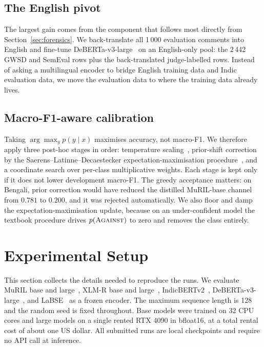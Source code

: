 \documentclass{ceurart}
\begin{document}
\subsection{The English pivot}
\label{sec:pivot}

The largest gain comes from the component that follows most directly from
Section~\ref{sec:forensics}. We back-translate all 1\,000 evaluation
comments into English and fine-tune DeBERTa-v3-large~\cite{he2023} on an
English-only pool: the 2\,442 GWSD and SemEval rows plus the back-translated
judge-labelled rows. Instead of asking a multilingual encoder to bridge
English training data and Indic evaluation data, we move the evaluation data
to where the training data already lives.

\subsection{Macro-F1-aware calibration}
\label{sec:calib}

Taking $\arg\max_y p(y \mid x)$ maximises accuracy, not macro-F1. We
therefore apply three post-hoc stages in order: temperature
scaling~\cite{guo2017}, prior-shift correction by the
Saerens--Latinne--Decaestecker expectation-maximisation
procedure~\cite{saerens2002}, and a coordinate search over per-class
multiplicative weights. Each stage is kept only if it does not lower
development macro-F1. The greedy acceptance matters: on Bengali, prior
correction would have reduced the distilled MuRIL-base channel from $0.781$
to $0.200$, and it was rejected automatically. We also floor and damp the
expectation-maximisation update, because on an under-confident model the
textbook procedure drives $p(\textsc{Against})$ to zero and removes the
class entirely.

\section{Experimental Setup}

This section collects the details needed to reproduce the runs. We evaluate
MuRIL base and large~\cite{khanuja2021}, XLM-R base and
large~\cite{conneau2020}, IndicBERTv2~\cite{doddapaneni2023},
DeBERTa-v3-large~\cite{he2023}, and LaBSE~\cite{feng2022} as a frozen
encoder. The maximum sequence length is 128 and the random seed is fixed
throughout. Base models were trained on 32 CPU cores and large models on a
single rented RTX 4090 in bfloat16, at a total rental cost of about one US
dollar. All submitted runs are local checkpoints and require no API call at
inference.
\end{document}
